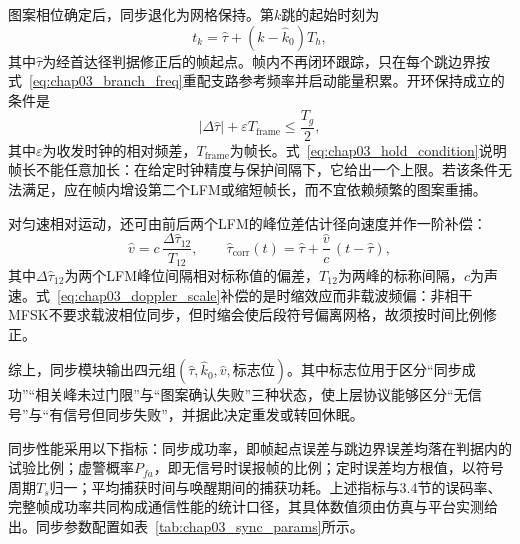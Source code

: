 图案相位确定后，同步退化为网格保持。第$k$跳的起始时刻为
\begin{equation}
 t_k=\hat\tau+(k-\hat k_0)T_h,
\label{eq:chap03_slot_grid}
\end{equation}
其中$\hat\tau$为经首达径判据修正后的帧起点。帧内不再闭环跟踪，只在每个跳边界按式~\eqref{eq:chap03_branch_freq}重配支路参考频率并启动能量积累。开环保持成立的条件是
\begin{equation}
 |\Delta\hat\tau|+\varepsilon T_{\mathrm{frame}}\le\frac{T_g}{2},
\label{eq:chap03_hold_condition}
\end{equation}
其中$\varepsilon$为收发时钟的相对频差，$T_{\mathrm{frame}}$为帧长。式~\eqref{eq:chap03_hold_condition}说明帧长不能任意加长：在给定时钟精度与保护间隔下，它给出一个上限。若该条件无法满足，应在帧内增设第二个LFM或缩短帧长，而不宜依赖频繁的图案重捕。

对匀速相对运动，还可由前后两个LFM的峰位差估计径向速度并作一阶补偿：
\begin{equation}
 \hat v=c\,\frac{\Delta\hat\tau_{12}}{T_{12}},\qquad
 \hat\tau_{\mathrm{corr}}(t)=\hat\tau+\frac{\hat v}{c}\,(t-\hat\tau),
\label{eq:chap03_doppler_scale}
\end{equation}
其中$\Delta\hat\tau_{12}$为两个LFM峰位间隔相对标称值的偏差，$T_{12}$为两峰的标称间隔，$c$为声速。式~\eqref{eq:chap03_doppler_scale}补偿的是时缩效应而非载波频偏：非相干MFSK不要求载波相位同步，但时缩会使后段符号偏离网格，故须按时间比例修正。

综上，同步模块输出四元组$(\hat\tau,\hat k_0,\hat v,\text{标志位})$。其中标志位用于区分“同步成功”“相关峰未过门限”与“图案确认失败”三种状态，使上层协议能够区分“无信号”与“有信号但同步失败”，并据此决定重发或转回休眠。

同步性能采用以下指标：同步成功率，即帧起点误差与跳边界误差均落在判据内的试验比例；虚警概率$P_{fa}$，即无信号时误报帧的比例；定时误差均方根值，以符号周期$T_s$归一；平均捕获时间与唤醒期间的捕获功耗。上述指标与3.4节的误码率、完整帧成功率共同构成通信性能的统计口径，其具体数值须由仿真与平台实测给出。同步参数配置如表~\ref{tab:chap03_sync_params}所示。

